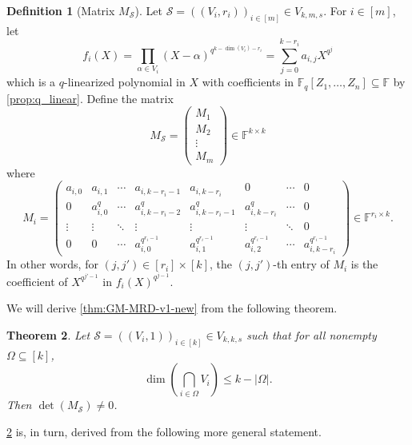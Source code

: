\documentclass[11pt]{article}
\theoremstyle{plain}
\newtheorem{thm}{Theorem}[section]
\theoremstyle{definition}
\newtheorem{defn}[thm]{Definition}
\theoremstyle{remark}
\newcommand{\F}{\mathbb{F}}
\newcommand{\cS}{\mathcal{S}}
\begin{document}
\begin{defn}[Matrix $M_{\cS}$]\label{defn:ms}
Let $\cS=((V_i,r_i))_{i\in [m]}\in V_{k,m,s}$.
For $i\in [m]$, let 
\begin{equation}\label{eq:fi}
f_i(X)=\prod_{\alpha\in V_i}(X-\alpha)^{q^{k-\dim(V_i)-r_i}}=\sum_{j=0}^{k-r_i}a_{i,j}X^{q^j}  
\end{equation}
which is a $q$-linearized polynomial in $X$ with coefficients in $\F_q[Z_1,\dots,Z_n]\subseteq\F$ by \cref{prop:q_linear}. 
Define the matrix 
\begin{equation}\label{eq:ms}
M_{\cS}=\begin{pmatrix}
	M_1\\
	M_2\\
	\vdots\\
	M_m
 \end{pmatrix}\in\mathbb{F}^{k\times k}
\end{equation}
where 
\begin{equation}\label{eq:mi}
M_i=\begin{pmatrix}
a_{i,0}&a_{i,1}&\cdots& a_{i,k-r_i-1} & a_{i,k-r_i}&  0 & \cdots &0   \\
0 &a_{i,0}^q& \cdots  & a_{i,k-r_i-2}^q & a_{i,k-r_i-1}^q & a_{i,k-r_i}^q & \cdots &0 \\
\vdots & \vdots &\ddots & \vdots &\vdots &\vdots& \ddots &0\\
0 &0  & \cdots &a_{i,0}^{q^{r_i-1}} & a_{i,1}^{q^{r_i-1}} & a_{i,2}^{q^{r_i-1}} &\cdots & a_{i,k-r_i}^{q^{r_i-1}} 
\end{pmatrix}\in\mathbb{F}^{r_i\times k}.
\end{equation}
In other words, for $(j,j')\in [r_i]\times [k]$, the $(j,j')$-th entry of $M_i$ is the coefficient of $X^{q^{j'-1}}$ in $f_i(X)^{q^{j-1}}$.
\end{defn}

We will derive \cref{thm:GM-MRD-v1-new} from the following theorem.

\begin{thm}\label{thm:GM-MRD-v2-new}
Let $\cS=((V_i,1))_{i\in [k]}\in V_{k,k,s}$ such that for all nonempty $\Omega\subseteq [k]$, 
\[
\dim\left(\bigcap_{i\in \Omega} V_i\right)\leq k-|\Omega|.
\]
Then $\det(M_{\cS})\neq 0$.
\end{thm}

\cref{thm:GM-MRD-v2-new} is, in turn, derived from the following more general statement.
\end{document}
